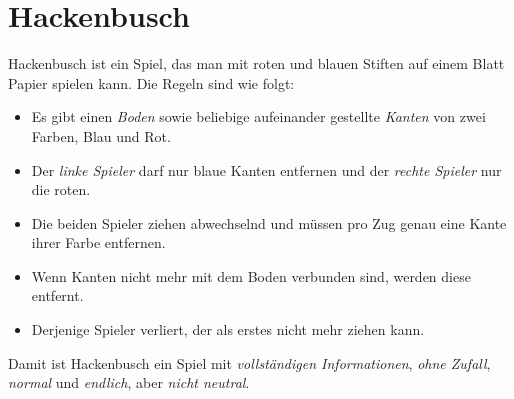 \documentclass{zirkelbrief1516}
\begin{document}
\section*{Hackenbusch}

Hackenbusch ist ein Spiel, das man mit roten und blauen Stiften auf einem Blatt Papier spielen kann. Die Regeln sind wie folgt:

\begin{itemize}
  \item Es gibt einen \emph{Boden} sowie beliebige aufeinander gestellte \emph{Kanten} von zwei Farben, Blau und Rot.
  \item Der \emph{linke Spieler} darf nur blaue Kanten entfernen und der \emph{rechte Spieler} nur die roten.
  \item Die beiden Spieler ziehen abwechselnd und müssen pro Zug genau eine Kante ihrer Farbe entfernen.
  \item Wenn Kanten nicht mehr mit dem Boden verbunden sind, werden diese entfernt.
  \item Derjenige Spieler verliert, der als erstes nicht mehr ziehen kann.
\end{itemize}

Damit ist Hackenbusch ein Spiel mit \emph{vollständigen Informationen}, \emph{ohne Zufall}, \emph{normal} und \emph{endlich}, aber \emph{nicht neutral}.
\end{document}
